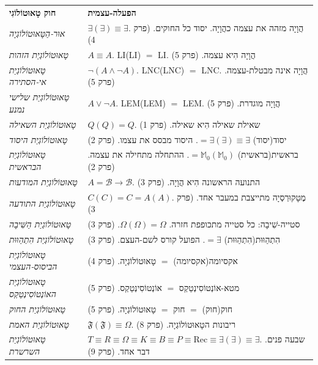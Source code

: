 \documentclass[10pt, openany, oneside]{book}
\renewcommand{\footnotesize}{\fontsize{8.5}{11}\selectfont}
\begin{document}
{\footnotesize
\noindent\begin{tabular}{@{} p{} @{\hspace{0.5em}} p{} @{}}
\textbf{חוק טָאוּטוֹלוֹגִי} & \textbf{הפעלה-עצמית} \\[0.5em]
\textit{אוּר-הַטָּאוּטוֹלוֹגְיָה} & $\exists(\exists) \equiv \exists$. הֲוָיָה מזהה את עצמה כהֲוָיָה. יסוד כל החוקים. (פרק 4) \\[0.3em]
\textit{טָאוּטוֹלוֹגְיַת הזהות} & $A \equiv A$. LI(LI) $=$ LI. הֲוָיָה הִיא עצמה. (פרק 5) \\[0.3em]
\textit{טָאוּטוֹלוֹגְיַת אי-הסתירה} & $\neg(A \wedge \neg A)$. LNC(LNC) $=$ LNC. הֲוָיָה אינה מבטלת-עצמה. (פרק 5) \\[0.3em]
\textit{טָאוּטוֹלוֹגְיַת שלישי נמנע} & $A \vee \neg A$. LEM(LEM) $=$ LEM. הֲוָיָה מוגדרת. (פרק 5) \\[0.3em]
\textit{טָאוּטוֹלוֹגְיַת השאילה} & $Q(Q) = Q$. שאילת שאילה הִיא שאילה. (פרק 1) \\[0.3em]
\textit{טָאוּטוֹלוֹגְיַת היסוד} & יסוד(יסוד) $= \exists(\exists) \equiv \exists$. היסוד מבסס את עצמו. (פרק 2) \\[0.3em]
\textit{טָאוּטוֹלוֹגְיַת הבראשית} & בראשית(בראשית) $= \mathbb{M}_0(\mathbb{M}_0)$. ההתחלה מתחילה את עצמה. (פרק 2) \\[0.3em]
\textit{טָאוּטוֹלוֹגְיַת המודעות} & $A = \mathcal{B} \to \mathcal{B}$. התנועה הראשונה הִיא הֲוָיָה. (פרק 3) \\[0.3em]
\textit{טָאוּטוֹלוֹגְיַת התודעה} & $C(C) = C = A(A)$. מֶטָקוּרְסְיָה מתייצבת במעבר אחד. (פרק 3) \\[0.3em]
\textit{טָאוּטוֹלוֹגְיַת הַשִּׁיבָה} & סטייה-שִׁיבָה: כל סטייה מתכופפת חזרה. $\Omega(\Omega) = \Omega$. (פרק 3) \\[0.3em]
\textit{טָאוּטוֹלוֹגְיַת הִתְהַוּוּת} & הִתְהַוּוּת(הִתְהַוּוּת) $= \exists$. הפועל קורס לשם-העצם. (פרק 3) \\[0.3em]
\textit{טָאוּטוֹלוֹגְיַת הביסוס-העצמי} & אקסיומה(אקסיומה) $=$ טָאוּטוֹלוֹגְיָה. (פרק 4) \\[0.3em]
\textit{טָאוּטוֹלוֹגְיַת האוֹנְטוֹסִינְטַקְס} & מטא-אוֹנְטוֹסִינְטַקְס $=$ אוֹנְטוֹסִינְטַקְס. (פרק 5) \\[0.3em]
\textit{טָאוּטוֹלוֹגְיַת החוק} & חוק(חוק) $=$ חוק $=$ טָאוּטוֹלוֹגְיָה. (פרק 5) \\[0.3em]
\textit{טָאוּטוֹלוֹגְיַת האמת} & $\mathfrak{F}(\mathfrak{F}) \equiv \Omega$. ריבונות הטָאוּטוֹלוֹגְיָה. (פרק 8) \\[0.3em]
\textit{טָאוּטוֹלוֹגְיַת השרשרת} & $T \equiv R \equiv \Omega \equiv K \equiv B \equiv P \equiv \text{Rec} \equiv \exists(\exists) \equiv \exists$. שבעה פנים. דבר אחד. (פרק 9) \\[0.3em]

\end{tabular}}
\end{document}
